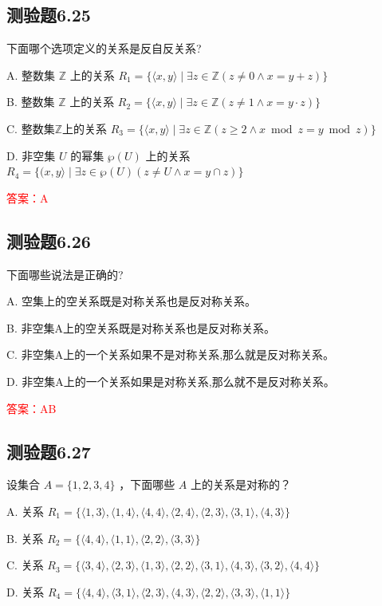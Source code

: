 \documentclass[UTF8, heading=true]{ctexart}
\begin{document}
\subsection{测验题6.25}
下面哪个选项定义的关系是反自反关系?

A. 整数集 $\mathbb{Z}$ 上的关系 $R_1=\{\langle x, y\rangle \mid \exists z \in \mathbb{Z}(z \neq 0 \wedge x=y+z)\}$

B. 整数集 $\mathbb{Z}$ 上的关系 $R_2=\{\langle x, y\rangle \mid \exists z \in \mathbb{Z}(z \neq 1 \wedge x=y \cdot z)\}$

C. 整数集$\mathbb{Z}$上的关系 $R_3=\{\langle x, y\rangle \mid \exists z \in \mathbb{Z}(z \geq 2 \wedge x \bmod z=y \bmod z)\}$

D. 非空集 $U$ 的幂集 $\wp(U)$ 上的关系 $R_4=\{(x, y\rangle \mid \exists z \in \wp(U)(z \neq U \wedge x=y \cap z)\}$

\textcolor{red}{答案：A}

\subsection{测验题6.26}

下面哪些说法是正确的?

A. 空集上的空关系既是对称关系也是反对称关系。

B. 非空集A上的空关系既是对称关系也是反对称关系。

C. 非空集A上的一个关系如果不是对称关系,那么就是反对称关系。

D. 非空集A上的一个关系如果是对称关系,那么就不是反对称关系。

\textcolor{red}{答案：AB}

\subsection{测验题6.27}

设集合 $A=\{1,2,3,4\}$ ，下面哪些 $A$ 上的关系是对称的？

A. 
关系 $R_1=\{\langle 1,3\rangle,\langle 1,4\rangle,\langle 4,4\rangle,\langle 2,4\rangle,\langle 2,3\rangle,\langle 3,1\rangle,\langle 4,3\rangle\}$

B. 
关系 $R_2=\{\langle 4,4\rangle,\langle 1,1\rangle,\langle 2,2\rangle,\langle 3,3\rangle\}$

C. 
关系 $R_3=\{\langle 3,4\rangle,\langle 2,3\rangle,\langle 1,3\rangle,\langle 2,2\rangle,\langle 3,1\rangle,\langle 4,3\rangle,\langle 3,2\rangle,\langle 4,4\rangle\}$

D. 
关系 $R_4=\{\langle 4,4\rangle,\langle 3,1\rangle,\langle 2,3\rangle,\langle 4,3\rangle,\langle 2,2\rangle,\langle 3,3\rangle,\langle 1,1\rangle\}$
\end{document}
